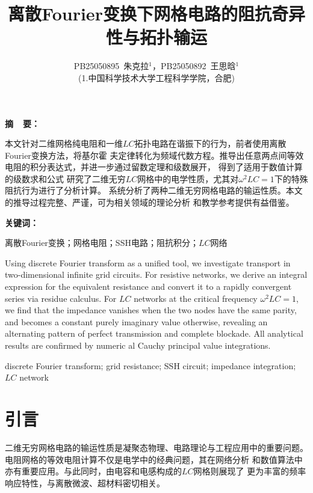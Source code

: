 \documentclass{article} %
\title{\LARGE \bfseries 离散Fourier变换下网格电路的阻抗奇异性与拓扑输运}
\author{
  PB25050895\ 朱克拉$^{1}$，\quad PB25050892\ 王思晗$^{1}$ \\
  \small (1.中国科学技术大学工程科学学院，合肥)
}
\date{}
\renewenvironment{abstract}{\small
  \textbf{摘\ \ 要：}
}{}
\newenvironment{keyword}{\small
  \textbf{关键词：}  
}{}
\newenvironment{abstract_en}{%
  \small
  \textbf{Abstract:}%
}{%
  \par
}
\newenvironment{keyword_en}{\small
  \textbf{Keywords:}  
}{}
\begin{document}
\maketitle

\begin{abstract}
  本文针对二维网格纯电阻和一维$LC$拓扑电路在谐振下的行为，前者使用离散Fourier变换方法，将基尔霍
  夫定律转化为频域代数方程。推导出任意两点间等效电阻的积分表达式，并进一步通过留数定理和级数展开，
  得到了适用于数值计算的级数求和公式
  研究了二维无穷$LC$网格中的电学性质，尤其对$\omega^2LC = 1$下的特殊阻抗行为进行了分析计算。
  系统分析了两种二维无穷网格电路的输运性质。本文的推导过程完整、严谨，可为相关领域的理论分析
  和教学参考提供有益借鉴。
\end{abstract}

\begin{keyword}
  离散Fourier变换；网格电阻；SSH电路；阻抗积分；$LC$网络
\end{keyword}

\vspace*{1em}

\begin{abstract_en}
Using discrete Fourier transform as a unified tool, 
we investigate transport in two-dimensional infinite
 grid circuits. For resistive networks, we derive an 
 integral expression for the equivalent resistance and
  convert it to a rapidly convergent series via residue
   calculus. For $LC$ networks at the critical frequency
    $\omega^2 LC = 1$, we find that the impedance vanishes
     when the two nodes have the same parity, and becomes a 
     constant purely imaginary value otherwise, revealing an
      alternating pattern of perfect transmission and complete
       blockade. All analytical results are confirmed by numeric
       al Cauchy principal value integrations.
\end{abstract_en}

\begin{keyword_en}
  discrete Fourier transform; grid resistance; SSH circuit; impedance integration; $LC$ network
\end{keyword_en}


\vspace*{1em}



\section{引言}

二维无穷网格电路的输运性质是凝聚态物理、电路理论与工程应用中的重要问题。
电阻网格的等效电阻计算不仅是电学中的经典问题，其在网络分析
和数值算法中亦有重要应用。与此同时，由电容和电感构成的$LC$网格则展现了
更为丰富的频率响应特性，与离散微波、超材料密切相关。
\end{document}
